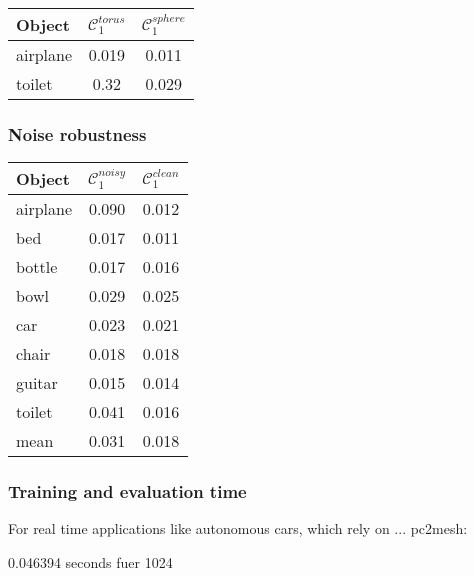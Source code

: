 \begin{center}
     \label{tab:distance7500} 
    \begin{center}
        \begin{tabular}{| l  | c | c |}
            \hline
            Object& $\mathcal{C}_1^{torus}$ & $\mathcal{C}_1^{sphere}$ \\ \hline
            \multirow{1}{*}{airplane}&0.019&0.011\\\hline
            \multirow{1}{*}{toilet}&0.32&0.029\\\hline
        \end{tabular}
    \end{center}
\end{center}

\subsubsection*{Noise robustness}
\begin{center}
     \label{tab:distance7500} 
    \begin{center}
        \begin{tabular}{| l  | c | c |}
            \hline
            Object& $\mathcal{C}_1^{noisy}$ & $\mathcal{C}_1^{clean}$ \\ \hline
            \multirow{1}{*}{airplane}&0.090&0.012\\\hline
            \multirow{1}{*}{bed}&0.017&0.011\\\hline
            \multirow{1}{*}{bottle}&0.017&0.016\\\hline
            \multirow{1}{*}{bowl}&0.029&0.025\\\hline
            \multirow{1}{*}{car}&0.023&0.021\\\hline
            \multirow{1}{*}{chair}&0.018&0.018\\\hline
            \multirow{1}{*}{guitar}&0.015&0.014\\\hline
            \multirow{1}{*}{toilet}&0.041&0.016\\\hline\hline
            \multirow{1}{*}{mean}&0.031&0.018\\\hline
        \end{tabular}
    \end{center}
\end{center}
\subsubsection*{Training and evaluation time}
For real time applications like autonomous cars, which rely on ...
pc2mesh:

0.046394 seconds fuer 1024


